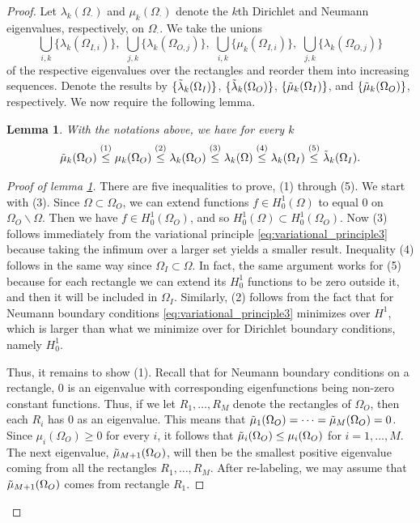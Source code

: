 \documentclass{amsart}
\newtheorem{lemma}[theorem]{Lemma}
\theoremstyle{definition}
\begin{document}
\begin{proof}
    Let $\lambda_k(\Omega_\cdot)$ and $\mu_k(\Omega_\cdot)$ denote the $k$th Dirichlet and Neumann eigenvalues, respectively, on $\Omega_\cdot$. We take the unions 
    \begin{equation*}
        \bigcup_{i,k} \{\lambda_k(\Omega_{I,i})\}, \,\,\bigcup_{j,k} \{\lambda_k(\Omega_{O,j})\}, \,\,\bigcup_{i,k} \{\mu_k(\Omega_{I,i})\}, \,\, \bigcup_{j,k} \{\lambda_k(\Omega_{O,j})\} 
    \end{equation*}
    of the respective eigenvalues over the rectangles and reorder them into increasing sequences. Denote the results by $\{\Tilde{\lambda}_k(\Omega_I)\}$, $\{\Tilde{\lambda}_k(\Omega_O)\}$, $\{\Tilde{\mu}_k(\Omega_I)\}$, and $\{\Tilde{\mu}_k(\Omega_O)\}$, respectively.  We now require the following lemma.
    \begin{lemma} \label{lemma:weyl_inequalities}
        With the notations above, we have for every $k$
        \begin{equation*}
            \Tilde{\mu}_k(\Omega_O) \stackrel{(1)}{\leq} \mu_k(\Omega_O) \stackrel{(2)}{\leq} \lambda_k(\Omega_O) \stackrel{(3)}{\leq} \lambda_k(\Omega) \stackrel{(4)}{\leq} \lambda_k(\Omega_I) \stackrel{(5)}{\leq} \Tilde{\lambda}_k(\Omega_I).
        \end{equation*}
    \end{lemma}
    \begin{proof}[Proof of lemma \ref{lemma:weyl_inequalities}] There are five inequalities to prove, (1) through (5). We start with (3). Since $\Omega \subset \Omega_O$, we can extend functions $f \in H_0^1(\Omega)$ to equal 0 on $\Omega_O \backslash \Omega$. Then we have $f \in H_0^1(\Omega_O)$, and so $H_0^1(\Omega) \subset H_0^1(\Omega_O)$. Now (3) follows immediately from the variational principle \eqref{eq:variational_principle3} because taking the infimum over a larger set yields a smaller result. Inequality (4) follows in the same way since $\Omega_I \subset \Omega$. In fact, the same argument works for (5) because for each rectangle we can extend its $H_0^1$ functions to be zero outside it, and then it will be included in $\Omega_I$. Similarly, (2) follows from the fact that for Neumann boundary conditions \eqref{eq:variational_principle3} minimizes over $H^1$, which is larger than what we minimize over for Dirichlet boundary conditions, namely $H_0^1$. 

    Thus, it remains to show (1). Recall that for Neumann boundary conditions on a rectangle, 0 is an eigenvalue with corresponding eigenfunctions being non-zero constant functions. Thus, if we let $R_1,\dots,R_M$ denote the rectangles of $\Omega_O$, then each $R_i$ has 0 as an eigenvalue. This means that $\Tilde{\mu}_1(\Omega_O) = \dots = \Tilde{\mu}_M(\Omega_O) = 0$. Since $\mu_i(\Omega_O) \geq 0$ for every $i$, it follows that $\Tilde{\mu}_i(\Omega_O) \leq \mu_i(\Omega_O)$ for $i = 1,\dots, M$. The next eigenvalue, $\Tilde{\mu}_{M+1}(\Omega_O)$, will then be the smallest positive eigenvalue coming from all the rectangles $R_1,\dots,R_M$. After re-labeling, we may assume that $\Tilde{\mu}_{M+1}(\Omega_O)$ comes from rectangle $R_1$. 


\end{proof}
\end{proof}
\end{document}
